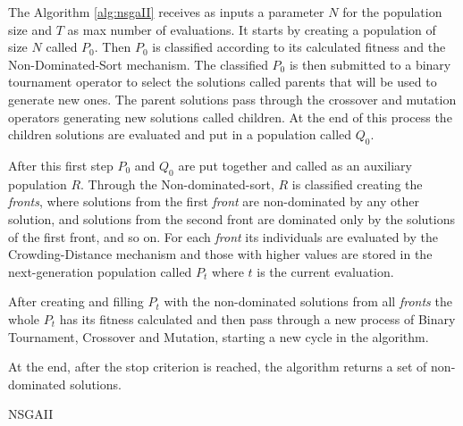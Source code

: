 The Algorithm \ref{alg:nsgaII} receives as inputs a parameter $N$ for the population size and $T$ as max number of evaluations. It starts by creating a population of size $N$ called $P_0$. Then $P_0$ is classified according to its calculated fitness and the Non-Dominated-Sort mechanism. The classified $P_0$ is then submitted to a binary tournament operator to select the solutions called parents that will be used to generate new ones. The parent solutions pass through the crossover and mutation operators generating new solutions called children. At the end of this process the children solutions are evaluated and put in a population called $Q_0$.


After this first step $P_0$ and $Q_0$ are put together and called as an auxiliary population $R$. Through the Non-dominated-sort, $R$ is classified creating the \textit{fronts}, where solutions from the first \textit{front} are non-dominated by any other solution, and solutions from the second front are dominated only by the solutions of the first front, and so on. For each \textit{front} its individuals are evaluated by the Crowding-Distance mechanism and those with higher values are stored in the next-generation population called $P_t$ where $t$ is the current evaluation.


After creating and filling $P_t$ with the non-dominated solutions from all \textit{fronts} the whole $P_t$ has its fitness calculated and then pass through a new process of Binary Tournament, Crossover and Mutation, starting a new cycle in the algorithm.


At the end, after the stop criterion is reached, the algorithm returns a set of non-dominated  solutions.


\begin{algorithm}[htb!]
	\begin{algorithmic}[1]
		\EndWhile
			\EndWhile
			
		\EndWhile
	\end{algorithmic}
	\caption{NSGAII}
	\label{alg:nsgaII}
\end{algorithm}


